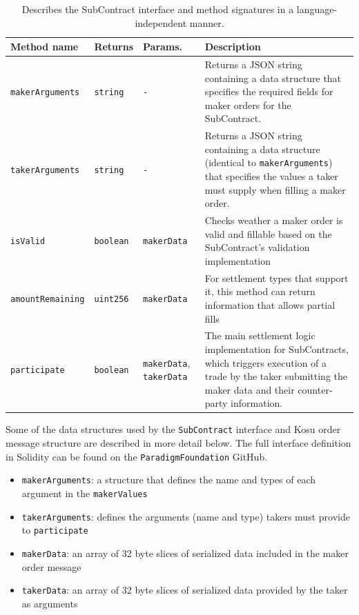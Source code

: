 \documentclass[10pt]{article}
\begin{document}
\bgroup
\def\arraystretch{1.2}
\begin{table}[H]
\centering
\label{table:table1}
\begin{tabularx}{1\textwidth}{|l|l|X|p{8cm}|}
\hline
\textbf{Method name} & \textbf{Returns} & \textbf{Params.} & \textbf{Description} \\ 
\hline
\texttt{makerArguments} & \texttt{string} & \texttt{-} & Returns a JSON string containing a data structure that specifies the required fields for maker orders for the SubContract. \\
\hline
\texttt{takerArguments} & \texttt{string} & \texttt{-} & Returns a JSON string containing a data structure (identical to \texttt{makerArguments}) that specifies the values a taker must supply when filling a maker order. \\
\hline
\texttt{isValid} & \texttt{boolean} & \texttt{makerData} & Checks weather a maker order is valid and fillable based on the SubContract's validation implementation \\
\hline
\texttt{amountRemaining} & \texttt{uint256} & \texttt{makerData} & For settlement types that support it, this method can return information that allows partial fills \\
\hline
\texttt{participate} & \texttt{boolean} & \texttt{makerData}, \texttt{takerData} & The main settlement logic implementation for SubContracts, which triggers execution of a trade by the taker submitting the maker data and their counter-party information. \\
\hline
\end{tabularx}
\caption{Describes the SubContract interface and method signatures in a language-independent manner.} 
\end{table}
\egroup

Some of the data structures used by the \texttt{SubContract} interface and Kosu order message structure are described in more detail below. The full interface definition in Solidity can be found on the \texttt{ParadigmFoundation} GitHub\cite{kosu-sdk}.

\begin{itemize}
  \item \texttt{makerArguments}: a structure that defines the name and types of each argument in the \texttt{makerValues}
  \item \texttt{takerArguments}: defines the arguments (name and type) takers must provide to \texttt{participate} 
  \item \texttt{makerData}: an array of 32 byte slices of serialized data included in the maker order message
  \item \texttt{takerData}: an array of 32 byte slices of serialized data provided by the taker as arguments
\end{itemize}
\end{document}
